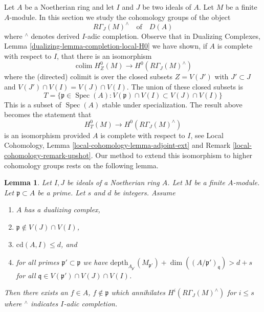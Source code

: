 \documentclass{stacks-project}
\theoremstyle{plain}
\newtheorem{lemma}[subsection]{Lemma}
\theoremstyle{definition}
\theoremstyle{remark}
\numberwithin{equation}{subsection}
\def\colim{\mathop{\mathrm{colim}}\nolimits}
\def\Spec{\mathop{\mathrm{Spec}}}
\begin{document}
\noindent
Let $A$ be a Noetherian ring and let $I$ and $J$ be two ideals of $A$.
Let $M$ be a finite $A$-module. In this section we study the
cohomology groups of the object
$$
R\Gamma_J(M)^\wedge
\quad\text{of}\quad
D(A)
$$
where ${}^\wedge$ denotes derived $I$-adic completion. Observe that in
Dualizing Complexes, Lemma \ref{dualizing-lemma-completion-local-H0}
we have shown, if $A$ is complete with respect to $I$,
that there is an isomorphism
$$
\colim H^0_Z(M) \longrightarrow H^0(R\Gamma_J(M)^\wedge)
$$
where the (directed) colimit is over the closed subsets $Z = V(J')$
with $J' \subset J$ and $V(J') \cap V(I) = V(J) \cap V(I)$.
The union of these closed subsets is
\begin{equation}
\label{equation-associated-subset}
T = \{\mathfrak p \in \Spec(A) :
V(\mathfrak p) \cap V(I) \subset V(J) \cap V(I)\}
\end{equation}
This is a subset of $\Spec(A)$ stable under specialization.
The result above becomes the statement that
$$
H^0_T(M) \longrightarrow H^0(R\Gamma_J(M)^\wedge)
$$
is an isomorphism provided $A$ is complete with respect to $I$, see
Local Cohomology, Lemma \ref{local-cohomology-lemma-adjoint-ext} and
Remark \ref{local-cohomology-remark-upshot}.
Our method to extend this isomorphism to higher cohomology groups
rests on the following lemma.

\begin{lemma}
\label{lemma-kill-completion-general}
Let $I, J$ be ideals of a Noetherian ring $A$.
Let $M$ be a finite $A$-module. Let $\mathfrak p \subset A$ be a prime.
Let $s$ and $d$ be integers. Assume
\begin{enumerate}
\item $A$ has a dualizing complex,
\item $\mathfrak p \not \in V(J) \cap V(I)$,
\item $\text{cd}(A, I) \leq d$, and
\item for all primes $\mathfrak p' \subset \mathfrak p$
we have
$\text{depth}_{A_{\mathfrak p'}}(M_{\mathfrak p'}) +
\dim((A/\mathfrak p')_\mathfrak q) > d + s$
for all $\mathfrak q \in V(\mathfrak p') \cap V(J) \cap V(I)$.
\end{enumerate}
Then there exists an $f \in A$, $f \not \in \mathfrak p$ which annihilates
$H^i(R\Gamma_J(M)^\wedge)$ for $i \leq s$ where ${}^\wedge$
indicates $I$-adic completion.
\end{lemma}
\end{document}
